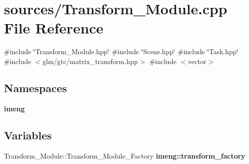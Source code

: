 \section{sources/\+Transform\+\_\+\+Module.cpp File Reference}
\label{_transform___module_8cpp}
{\ttfamily \#include \char`\"{}Transform\+\_\+\+Module.\+hpp\char`\"{}}\newline
{\ttfamily \#include \char`\"{}Scene.\+hpp\char`\"{}}\newline
{\ttfamily \#include \char`\"{}Task.\+hpp\char`\"{}}\newline
{\ttfamily \#include $<$glm/gtc/matrix\+\_\+transform.\+hpp$>$}\newline
{\ttfamily \#include $<$vector$>$}\newline
\subsection*{Namespaces}
\begin{DoxyCompactItemize}
\item 
 \textbf{ imeng}
\end{DoxyCompactItemize}
\subsection*{Variables}
\begin{DoxyCompactItemize}
\item 
Transform\+\_\+\+Module\+::\+Transform\+\_\+\+Module\+\_\+\+Factory \textbf{ imeng\+::transform\+\_\+factory}
\end{DoxyCompactItemize}

